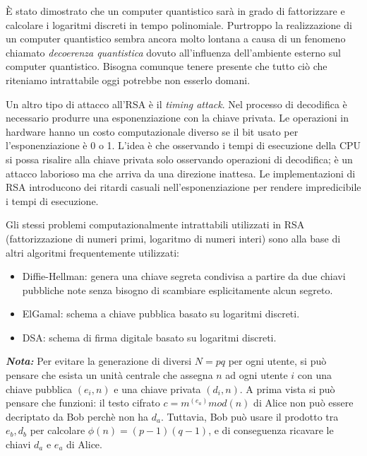 È stato dimostrato che un computer quantistico sarà in grado di fattorizzare e calcolare i logaritmi discreti in tempo polinomiale. Purtroppo la realizzazione di un computer quantistico sembra ancora molto lontana a causa di un fenomeno chiamato \textit{decoerenza quantistica} dovuto all'influenza dell'ambiente esterno sul computer quantistico. Bisogna comunque tenere presente che tutto ciò che riteniamo intrattabile oggi potrebbe non esserlo domani.

Un altro tipo di attacco all'RSA è il \textit{timing attack}. Nel processo di decodifica è necessario produrre una esponenziazione con la chiave privata. Le operazioni in hardware hanno un costo computazionale diverso se il bit usato per l'esponenziazione è 0 o 1. L'idea è che osservando i tempi di esecuzione della CPU si possa risalire alla chiave privata solo osservando operazioni di decodifica; è un attacco laborioso ma che arriva da una direzione inattesa. Le implementazioni di RSA introducono dei ritardi casuali nell'esponenziazione per rendere impredicibile i tempi di esecuzione.

Gli stessi problemi computazionalmente intrattabili utilizzati in RSA (fattorizzazione di numeri primi, logaritmo di numeri interi) sono alla base di altri algoritmi frequentemente utilizzati:
\begin{itemize}
	\item Diffie-Hellman: genera una chiave segreta condivisa a partire da due chiavi pubbliche note senza bisogno di scambiare esplicitamente alcun segreto.
	\item ElGamal: schema a chiave pubblica basato su logaritmi discreti.
	\item DSA: schema di firma digitale basato su logaritmi discreti.
\end{itemize}

\textbf{\textit{Nota:}} Per evitare la generazione di diversi $N=pq$ per ogni utente, si può pensare che esista un unità centrale che assegna $n$ ad ogni utente $i$ con una chiave pubblica $(e_i, n)$ e una chiave privata $(d_i, n)$. A prima vista si può pensare che funzioni: il testo cifrato $c=m^(e_a)mod(n)$ di Alice non può essere decriptato da Bob perchè non ha $d_a$. Tuttavia, Bob può usare il prodotto tra $e_b, d_b$ per calcolare $\phi(n)=(p-1)(q-1)$, e di conseguenza ricavare le chiavi $d_a$ e $e_a$ di Alice.

